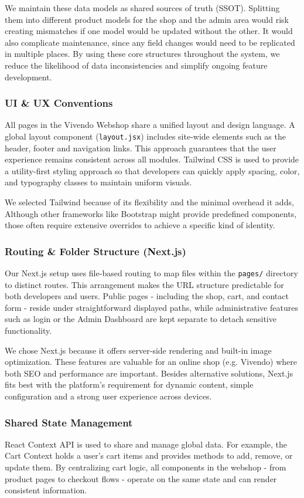 We maintain these data models as shared sources of truth (SSOT). Splitting them into different product models for the shop and the admin area would risk creating mismatches if one model would be updated without the other. It would also complicate maintenance, since any field changes would need to be replicated in multiple places. By using these core structures throughout the system, we reduce the likelihood of data inconsistencies and simplify ongoing feature development.

\subsubsection{UI \& UX Conventions}
All pages in the Vivendo Webshop share a unified layout and design language. A global layout component (\texttt{layout.jsx}) includes site-wide elements such as the header, footer and navigation links. This approach guarantees that the user experience remains consistent across all modules. Tailwind CSS is used to provide a utility-first styling approach so that developers can quickly apply spacing, color, and typography classes to maintain uniform visuals. 

We selected Tailwind because of its flexibility and the minimal overhead it adds, Although other frameworks like Bootstrap might provide predefined components, those often require extensive overrides to achieve a specific kind of identity. 

\subsubsection{Routing \& Folder Structure (Next.js)}
Our Next.js setup uses file-based routing to map files within the \texttt{pages/} directory to distinct routes. This arrangement makes the URL structure predictable for both developers and users. Public pages - including the shop, cart, and contact form - reside under straightforward displayed paths, while administrative features such as login or the Admin Dashboard are kept separate to detach sensitive functionality.

We chose Next.js because it offers server-side rendering and built-in image optimization. These features are valuable for an online shop (e.g. Vivendo) where both SEO and performance are important. Besides alternative solutions, Next.js fits best with the platform's requirement for dynamic content, simple configuration and a strong user experience across devices.

\subsubsection{Shared State Management}
React Context API is used to share and manage global data. For example, the Cart Context holds a user’s cart items and provides methods to add, remove, or update them. By centralizing cart logic, all components in the webshop - from product pages to checkout flows - operate on the same state and can render consistent information. 

